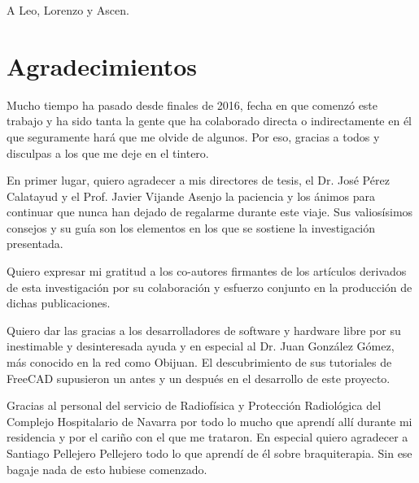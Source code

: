 \newpage
\thispagestyle{empty}
\begin{flushright}
\end{flushright}

\newpage
\thispagestyle{empty}
\begin{flushright}
A Leo, Lorenzo y Ascen.
\end{flushright}


\newpage
\thispagestyle{empty}
\begin{flushright}
\end{flushright}



\hypertarget{Agradecimientos}{%
\chapter*{Agradecimientos}\label{agradecimientos}}


Mucho tiempo ha pasado desde finales de 2016, fecha en que comenzó este trabajo y ha sido tanta la gente que ha colaborado directa o indirectamente en él que seguramente hará que me olvide de algunos. Por eso, gracias a todos y disculpas a los que me deje en el tintero.

En primer lugar, quiero agradecer a mis directores de tesis, el Dr. José Pérez Calatayud y el Prof. Javier Vijande Asenjo la paciencia y los ánimos para continuar que nunca han dejado de regalarme durante este viaje. Sus valiosísimos consejos y su guía son los elementos en los que se sostiene la investigación presentada.         

Quiero expresar mi gratitud a los co-autores firmantes de los artículos derivados de esta investigación por su colaboración y esfuerzo conjunto en la producción de dichas publicaciones.

Quiero dar las gracias a los desarrolladores de software y hardware libre por su inestimable y desinteresada ayuda y en especial al Dr. Juan González Gómez, más conocido en la red como Obijuan. El descubrimiento de sus tutoriales de FreeCAD supusieron un antes y un después en el desarrollo de este proyecto.   

Gracias al personal del servicio de Radiofísica y Protección Radiológica del Complejo Hospitalario de Navarra por todo lo mucho que aprendí allí durante mi residencia y por el cariño con el que me trataron. En especial quiero agradecer a Santiago Pellejero Pellejero todo lo que aprendí de él sobre braquiterapia. Sin ese bagaje nada de esto hubiese comenzado.

